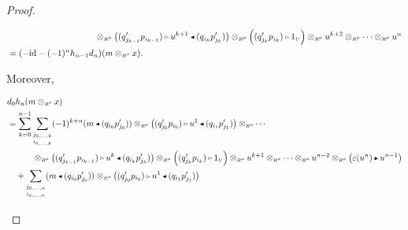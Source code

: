 \documentclass[reqno, a4paper, 10pt]{amsart}
\numberwithin{equation}{section}
\theoremstyle{plain}
\theoremstyle{definition}
\theoremstyle{remark}
\begin{document}
\begin{proof}
\begin{footnotesize}
\begin{equation*}
\begin{split}
&  \hspace*{3.5cm} \otimes_{{\scriptscriptstyle{{R^{o}}}}} {\big( { (q'_{j_{k-1}}p_{i_{k-1}}) {{\,\raise1pt\hbox{$\scriptscriptstyle{\rhd}$} \, }} u^{k+1} {{\,\raise1pt\hbox{$\scriptscriptstyle{\blacktriangleleft}$} \, }}   (q_{i_k}p'_{j_k}) } \big)} \otimes_{{\scriptscriptstyle{{R^{o}}}}}  \Big( (q'_{j_k}p_{i_k})  {{\,\raise1pt\hbox{$\scriptscriptstyle{\rhd}$} \, }} 1_{{\scriptscriptstyle{U}}} \Big) \otimes_{{\scriptscriptstyle{{R^{o}}}}} u^{k+2} \otimes_{{\scriptscriptstyle{{R^{o}}}}} \cdots \otimes_{{\scriptscriptstyle{{R^{o}}}}} u^n \\
&= (- {{\rm id}} -  (-1)^n h_{n-1} d_n) (m \otimes_{{\scriptscriptstyle{{R^{o}}}}} x).
\end{split}
\end{equation*}
\end{footnotesize}
Moreover,
\begin{footnotesize}
\begin{equation*}
\begin{split}
& d_{0} h_n(m \otimes_{{\scriptscriptstyle{{R^{o}}}}} x)  \\ 
& =\sum^{n-1}_{k=0} \underset{\underset{i_{0, \ldots, k}}{j_{0,\ldots, k}}}{\sum}  (-1)^{k+n} (m {{\,\raise1pt\hbox{$\scriptscriptstyle{\blacktriangleleft}$} \, }} (q_{i_0}p'_{j_0}) )
\otimes_{{\scriptscriptstyle{{R^{o}}}}} {\big( { (q'_{j_0}p_{i_0}) {{\,\raise1pt\hbox{$\scriptscriptstyle{\rhd}$} \, }} u^1 {{\,\raise1pt\hbox{$\scriptscriptstyle{\blacktriangleleft}$} \, }} (q_{i_1}p'_{j_1}) } \big)}
\otimes_{{\scriptscriptstyle{{R^{o}}}}}  \cdots  \\
&\qquad \quad \otimes_{{\scriptscriptstyle{{R^{o}}}}}{\big( { (q'_{j_{k-1}}p_{i_{k-1}}) {{\,\raise1pt\hbox{$\scriptscriptstyle{\rhd}$} \, }} u^k {{\,\raise1pt\hbox{$\scriptscriptstyle{\blacktriangleleft}$} \, }}   (q_{i_k}p'_{j_k}) } \big)}   \otimes_{{\scriptscriptstyle{{R^{o}}}}}  \Big( (q'_{j_k}p_{i_k})  {{\,\raise1pt\hbox{$\scriptscriptstyle{\rhd}$} \, }} 1_{{\scriptscriptstyle{U}}} \Big) \otimes_{{\scriptscriptstyle{{R^{o}}}}} u^{k+1} \otimes_{{\scriptscriptstyle{{R^{o}}}}} \cdots \otimes_{{\scriptscriptstyle{{R^{o}}}}} u^{n-2} \otimes_{{\scriptscriptstyle{{R^{o}}}}} \big({\varepsilon}(u^n) {{\,\raise1pt\hbox{$\scriptscriptstyle{\blacktriangleright}$} \, }} u^{n-1}\big) \\
& 
\quad +  \underset{\underset{i_{0,\ldots,{n}}}{j_{0,\ldots,{n}}}}{\sum} (m {{\,\raise1pt\hbox{$\scriptscriptstyle{\blacktriangleleft}$} \, }} (q_{i_0}p'_{j_0}) )
\otimes_{{\scriptscriptstyle{{R^{o}}}}} {\big( { (q'_{j_0}p_{i_0}) {{\,\raise1pt\hbox{$\scriptscriptstyle{\rhd}$} \, }} u^1 {{\,\raise1pt\hbox{$\scriptscriptstyle{\blacktriangleleft}$} \, }} (q_{i_1}p'_{j_1}) } \big)}

\end{split}
\end{equation*}
\end{footnotesize}
\end{proof}
\end{document}

